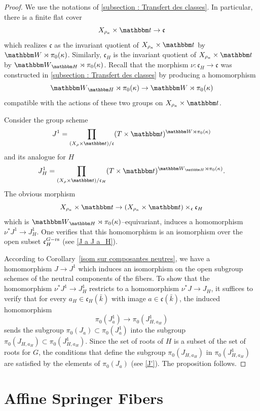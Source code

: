 \documentclass[12pt,english]{smfart}
\numberwithin{equation}{subsection}
\theoremstyle{remark}
\newcommand\HH{{\mathbbm H}}
\newcommand\bbW{{\mathbbm W}}
\newcommand\bbt{{\mathbbm t}}
\newcommand\rs{{\rm rs}}
\begin{document}
\begin{proof}
We use the notations of \ref{subsection : Transfert des classes}. In particular, there is a finite flat cover 
$$
X_{\rho_\kappa}\times \bbt\to \mathfrak{c}
$$
which realizes $\mathfrak{c}$ as the invariant quotient of $X_{\rho_\kappa}\times \bbt$ by $\bbW\rtimes\pi_0(\kappa)$. Similarly, $\mathfrak{c}_H$ is the invariant quotient of $X_{\rho_\kappa}\times \bbt$ by $\bbW_\HH\rtimes\pi_0(\kappa)$. Recall that the morphism $\nu:\mathfrak{c}_H\to\mathfrak{c}$ was constructed in \ref{subsection : Transfert des classes} by producing a homomorphism
$$
\bbW_\HH\rtimes \pi_0(\kappa) \to \bbW\rtimes \pi_0(\kappa)
$$
compatible with the actions of these two groups on $X_{\rho_\kappa}\times \bbt$.

Consider the group scheme
$$
J^1=\prod_{(X_\rho\times \bbt)/\mathfrak{c}} (T\times \bbt)^{\bbW\rtimes \pi_0(\kappa)}
$$
and its analogue for $H$
$$
J_H^1=\prod_{(X_\rho\times \bbt)/\mathfrak{c}_H} (T\times \bbt)^{\bbW_\HH\rtimes \pi_0(\kappa)}.
$$
The obvious morphism
$$
X_{\rho_\kappa}\times \bbt \to (X_{\rho_\kappa}\times \bbt)\times_{\mathfrak{c}} \mathfrak{c}_H
$$
which is $\bbW_\HH\rtimes \pi_0(\kappa)$--equivariant, induces a homomorphism $\nu^* J^1\to J_H^1$. One verifies that this homomorphism is an isomorphism over the open subset $\mathfrak{c}_H^{G-\rs}$ (see \ref{J a J a_H}).

According to Corollary~\ref{isom sur composantes neutres}, we have a homomorphism $J\to J^1$ which induces an isomorphism on the open subgroup schemes of the neutral components of the fibers. To show that the homomorphism $\nu^* J^1\to J_H^1$ restricts to a homomorphism $\nu^*J\to J_H$, it suffices to verify that for every $a_H\in \mathfrak{c}_H(\bar{k})$ with image $a\in\mathfrak{c}(\bar{k})$, the induced homomorphism
$$
\pi_0(J^1_a)\to \pi_0(J^1_{H,a_H})
$$
sends the subgroup $\pi_0(J_a)\subset \pi_0(J^1_a)$ into the subgroup $\pi_0(J_{H,a_H})\subset \pi_0(J^1_{H,a_H})$. Since the set of roots of $H$ is a subset of the set of roots for $G$, the conditions that define the subgroup $\pi_0(J_{H,a_H})$ in $\pi_0(J^1_{H,a_H})$ are satisfied by the elements of $\pi_0(J_a)$ (see \ref{J'}). The proposition follows.
\end{proof}

\section{Affine Springer Fibers}
\label{section : Fibres de Springer affines}
\end{document}
